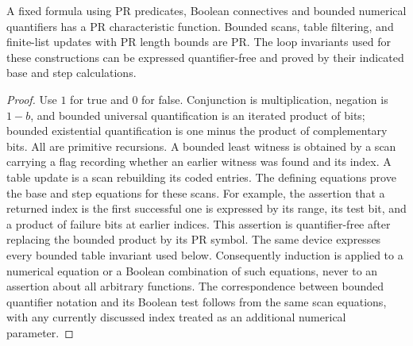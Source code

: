 \begin{lemma}\label{lem:bounded}
A fixed formula using PR predicates, Boolean connectives and bounded numerical
quantifiers has a PR characteristic function. Bounded scans, table filtering,
and finite-list updates with PR length bounds are PR. The loop invariants used
for these constructions can be expressed quantifier-free and proved by their
indicated base and step calculations.
\end{lemma}
\begin{proof}
Use $1$ for true and $0$ for false. Conjunction is multiplication, negation is
$1-b$, and bounded universal quantification is an iterated product of bits;
bounded existential quantification is one minus the product of complementary
bits. All are primitive recursions. A bounded least witness is obtained by a
scan carrying a flag recording whether an earlier witness was found and its
index. A table update is a scan rebuilding its coded entries.
The defining equations prove the base and step equations for these scans.
For example, the assertion that a returned index is the first successful
one is expressed by its range, its test bit, and a product of failure bits
at earlier indices. This assertion is quantifier-free after replacing the
bounded product by its PR symbol. The same device expresses every bounded
table invariant used below. Consequently induction is applied to a numerical
equation or a Boolean combination of such equations, never to an assertion
about all arbitrary functions. The correspondence between bounded quantifier
notation and its Boolean test follows from the same scan equations, with
any currently discussed index treated as an additional numerical parameter.
\end{proof}

